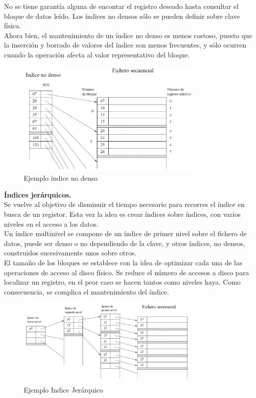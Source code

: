 \documentclass[a4paper,11pt]{article}
\begin{document}
No se tiene garantía alguna de encontar el registro deseado hasta consultar el bloque de datos leído. Los índices no densos sólo se pueden definir sobre clave física. \\

Ahora bien, el mantenimiento de un índice no denso es menos costoso, puesto que la inserción y borrado de valores del índice son menos frecuentes, y sólo ocurren cuando la operación afecta al valor representativo del bloque. \\

\begin{figure}
\centering
\caption{Ejemplo índice no denso}
\includegraphics[scale=1,width=0.8\textwidth]{indice_no_denso.png}
\end{figure}

\textbf{Índices jerárquicos.} \\
Se vuelve al objetivo de disminuir el tiempo necesario para recorres el índice en busca de un registor. Esta vez la idea es crear índices sobre índices, con varios niveles en el acceso a los datos. \\

Un índice multinivel se compone de un índice de primer nivel sobre el fichero de datos, puede ser denso o no dependiendo de la clave, y otros índices, no densos, construidos sucesivamente unos sobre otros. \\

El tamaño de los bloques se establece con la idea de optimizar cada una de las operaciones de acceso al disco físico. Se reduce el número de accesos a disco para localizar un registro, en el peor caso se hacen tantos como niveles haya. Como consecuencia, se complica el mantenimiento del índice. \\

\begin{figure}[h]
\centering
\caption{Ejemplo Indice Jerárquico}
\includegraphics[scale=1,width=0.8\textwidth]{indice_jerarquico.png}
\end{figure}
\end{document}
